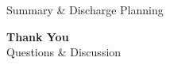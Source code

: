 \begin{frame}{Summary \& Discharge Planning}
  \vspace{0.4cm}

  \begin{center}
    \begin{tcolorbox}[darkcta]
      \centering\color{white}\textbf{\large Thank You}\\[2pt]
      {\small Questions \& Discussion}
    \end{tcolorbox}
  \end{center}
\end{frame}
